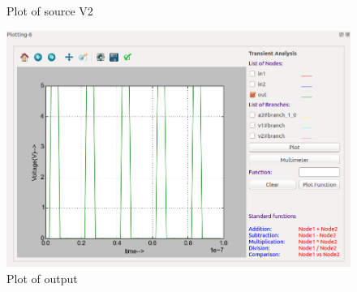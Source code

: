 \begin{enumerate}
\begin{figure}[!htp]
                        \caption{Plot of source V2}
                        \label{plotv2}
                    \end{figure}
\begin{figure}[!htp]
                        \centering
                        \includegraphics[width =\lgfig]{./NGHDL/plotout.png}
                        \caption{Plot of output}
                        \label{plotout}
                    \end{figure}

        \pagebreak

\end{enumerate}